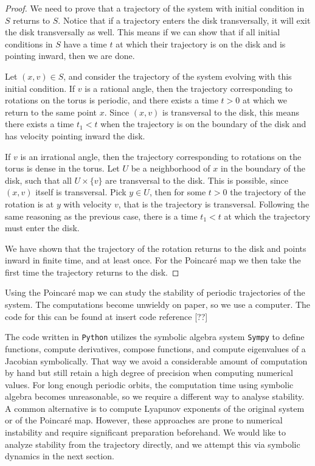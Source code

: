 \begin{proof}
We need to prove that a trajectory of the system with initial condition in $S$ returns to $S$. Notice that if a trajectory enters the disk transversally, it will exit the disk transversally as well. This means if we can show that if all initial conditions in $S$ have a time $t$ at which their trajectory is on the disk and is pointing inward, then we are done.

Let $(x,v)\in S$, and consider the trajectory of the system evolving with this initial condition. If $v$ is a rational angle, then the trajectory corresponding to rotations on the torus is periodic, and there exists a time $t>0$ at which we return to the same point $x$. Since $(x,v)$ is transversal to the disk, this means there exists a time $t_1<t$ when the trajectory is on the boundary of the disk and has velocity pointing inward the disk.

If $v$ is an irrational angle, then the trajectory corresponding to rotations on the torus is dense in the torus. Let $U$ be a neighborhood of $x$ in the boundary of the disk, such that all $U\times\{v\}$ are transversal to the disk. This is possible, since $(x,v)$ itself is transversal. Pick $y\in U$, then for some $t>0$ the trajectory of the rotation is at $y$ with velocity $v$, that is the trajectory is transversal. Following the same reasoning as the previous case, there is a time $t_1<t$ at which the trajectory must enter the disk.

We have shown that the trajectory of the rotation returns to the disk and points inward in finite time, and at least once. For the Poincar\'e map we then take the first time the trajectory returns to the disk. 
\end{proof}

Using the Poincar\'e map we can study the stability of periodic trajectories of the system. The computations become unwieldy on paper, so we use a computer. The code for this can be found at \color{red}insert code reference [??]\color{black}

The code written in \texttt{Python} utilizes the symbolic algebra system \texttt{Sympy} to define functions, compute derivatives, compose functions, and compute eigenvalues of a Jacobian symbolically. That way we avoid a considerable amount of computation by hand but still retain a high degree of precision when computing numerical values. For long enough periodic orbits, the computation time using symbolic algebra becomes unreasonable, so we require a different way to analyse stability. A common alternative is to compute Lyapunov exponents of the original system or of the Poincar\'e map. However, these approaches are prone to numerical instability and require significant preparation beforehand. We would like to analyze stability from the trajectory directly, and we attempt this via symbolic dynamics in the next section.


